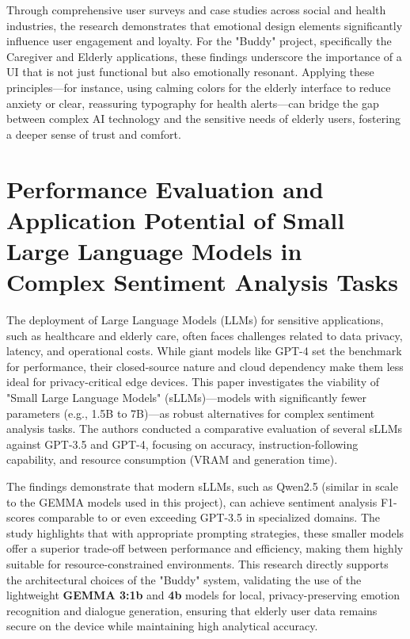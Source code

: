 Through comprehensive user surveys and case studies across social and health industries, the research demonstrates that emotional design elements significantly influence user engagement and loyalty. For the "Buddy" project, specifically the Caregiver and Elderly applications, these findings underscore the importance of a UI that is not just functional but also emotionally resonant. Applying these principles—for instance, using calming colors for the elderly interface to reduce anxiety or clear, reassuring typography for health alerts—can bridge the gap between complex AI technology and the sensitive needs of elderly users, fostering a deeper sense of trust and comfort.

\newpage
\section[Performance Evaluation and Application Potential of Small Large Language Models in Complex Sentiment Analysis Tasks]{Performance Evaluation and Application Potential of Small Large Language Models in Complex Sentiment Analysis Tasks \cite{paper_9}}
\hspace*{17pt} The deployment of Large Language Models (LLMs) for sensitive applications, such as healthcare and elderly care, often faces challenges related to data privacy, latency, and operational costs. While giant models like GPT-4 set the benchmark for performance, their closed-source nature and cloud dependency make them less ideal for privacy-critical edge devices. This paper investigates the viability of "Small Large Language Models" (sLLMs)—models with significantly fewer parameters (e.g., 1.5B to 7B)—as robust alternatives for complex sentiment analysis tasks. The authors conducted a comparative evaluation of several sLLMs against GPT-3.5 and GPT-4, focusing on accuracy, instruction-following capability, and resource consumption (VRAM and generation time).

The findings demonstrate that modern sLLMs, such as Qwen2.5 (similar in scale to the GEMMA models used in this project), can achieve sentiment analysis F1-scores comparable to or even exceeding GPT-3.5 in specialized domains. The study highlights that with appropriate prompting strategies, these smaller models offer a superior trade-off between performance and efficiency, making them highly suitable for resource-constrained environments. This research directly supports the architectural choices of the "Buddy" system, validating the use of the lightweight \textbf{GEMMA 3:1b} and \textbf{4b} models for local, privacy-preserving emotion recognition and dialogue generation, ensuring that elderly user data remains secure on the device while maintaining high analytical accuracy.

